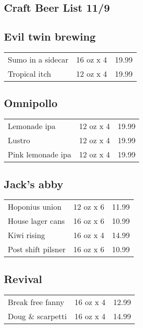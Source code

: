 \documentclass{article}%
\begin{document}
%
\pagestyle{empty}%
\normalsize%
%
\setlength{\columnseprule}{0.5pt}%
\setlength{\columnsep}{1cm}%
\renewcommand{\familydefault}{\sfdefault}%
\sffamily%
\begin{multicols}{3}%
\section*{\selectfont Craft Beer List 11/9}%

%
\subsection*{Evil twin brewing}%
\begin{tabular}{l c r}%
Sumo in a sidecar&16 oz x 4&19.99\\%
Tropical itch&12 oz x 4&19.99\\%
\end{tabular}

%
\subsection*{Omnipollo}%
\begin{tabular}{l c r}%
Lemonade ipa&12 oz x 4&19.99\\%
Lustro&12 oz x 4&19.99\\%
Pink lemonade ipa&12 oz x 4&19.99\\%
\end{tabular}

%
\subsection*{Jack's abby}%
\begin{tabular}{l c r}%
Hoponius union&12 oz x 6&11.99\\%
House lager cans&16 oz x 6&10.99\\%
Kiwi rising&16 oz x 4&14.99\\%
Post shift pilsner&16 oz x 6&10.99\\%
\end{tabular}

%
\subsection*{Revival}%
\begin{tabular}{l c r}%
Break free fanny&16 oz x 4&12.99\\%
Doug \& scarpetti&16 oz x 4&14.99\\%
\end{tabular}


\end{multicols}
\end{document}
